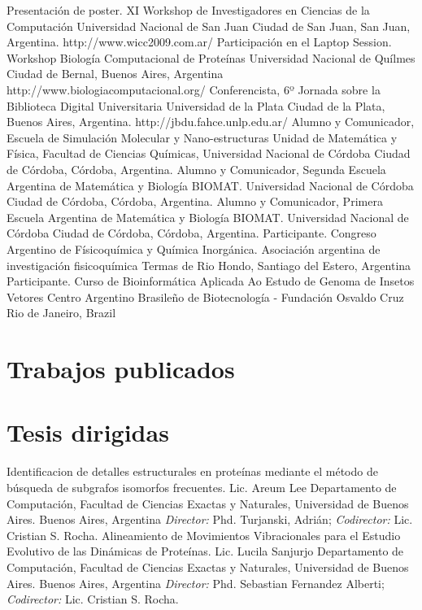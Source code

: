 	{Presentación de poster. XI Workshop de Investigadores en Ciencias de la Computación}
	{Universidad Nacional de San Juan}
	{Ciudad de San Juan, San Juan, Argentina.}
	{}
	{http://www.wicc2009.com.ar/}
	{Participación en el Laptop Session. Workshop Biología Computacional de Proteínas}
	{Universidad Nacional de Quílmes}
	{Ciudad de Bernal, Buenos Aires, Argentina}
	{}
	{http://www.biologiacomputacional.org/}
	{Conferencista, 6º Jornada sobre la Biblioteca Digital Universitaria}
	{Universidad de la Plata}
	{Ciudad de la Plata, Buenos Aires, Argentina.}
	{}
	{http://jbdu.fahce.unlp.edu.ar/}
	{Alumno y Comunicador, Escuela de Simulación Molecular y Nano-estructuras}
	{Unidad de Matemática y Física, Facultad de Ciencias Químicas, Universidad Nacional de Córdoba}
	{Ciudad de Córdoba, Córdoba, Argentina.}
	{}
	{}
	{Alumno y Comunicador, Segunda Escuela Argentina de Matemática y Biología}
	{BIOMAT. Universidad Nacional de Córdoba}
	{Ciudad de Córdoba, Córdoba, Argentina.}
	{}
	{}
	{Alumno y Comunicador, Primera Escuela Argentina de Matemática y Biología}
	{BIOMAT. Universidad Nacional de Córdoba}
	{Ciudad de Córdoba, Córdoba, Argentina.}
	{}
	{}
	{Participante. Congreso Argentino de Físicoquímica y Química Inorgánica.}
	{Asociación argentina de investigación fisicoquímica}
	{Termas de Rio Hondo, Santiago del Estero, Argentina}
	{}
	{}
	{Participante. Curso de Bioinformática Aplicada Ao Estudo de Genoma de Insetos Vetores}
	{Centro Argentino Brasileño de Biotecnología - Fundación Osvaldo Cruz}
	{Rio de Janeiro, Brazil}
	{}
	{}

\section{Trabajos publicados}
	\bibliographyunit
	\begin{bibunit}[plain]
		\nocite{*}
	\end{bibunit}

\section{Tesis dirigidas}

	{Identificacion de detalles estructurales en proteínas mediante el método de búsqueda de subgrafos isomorfos frecuentes. Lic. Areum Lee}
	{Departamento de Computación, Facultad de Ciencias Exactas y Naturales, Universidad de Buenos Aires.}
	{Buenos Aires, Argentina}
	{}
	{\emph{Director:} Phd. Turjanski, Adrián; \emph{Codirector:} Lic. Cristian S. Rocha.}
	{Alineamiento de Movimientos Vibracionales para el Estudio Evolutivo de las Dinámicas de Proteínas. Lic. Lucila Sanjurjo} 
	{Departamento de Computación, Facultad de Ciencias Exactas y Naturales, Universidad de Buenos Aires.}
	{Buenos Aires, Argentina}
	{}
	{\emph{Director:} Phd. Sebastian Fernandez Alberti; \emph{Codirector:} Lic. Cristian S. Rocha.}


